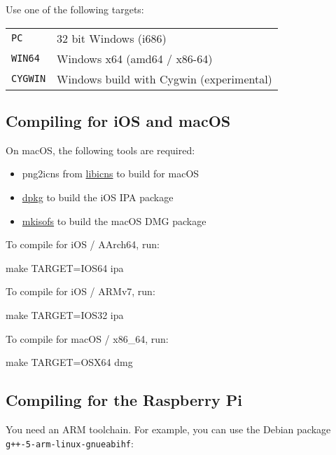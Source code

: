 Use one of the following targets:

\begin{tabularx}{1.9\textwidth}{lX}

\texttt{PC} & 32 bit Windows (i686) \\

\texttt{WIN64} & Windows x64 (amd64 / x86-64) \\

\texttt{CYGWIN} & Windows build with Cygwin (experimental) \\

\end{tabularx}

\subsection{Compiling for iOS and macOS}

On macOS, the following tools are required:
\begin{itemize}
\item png2icns from \href{http://icns.sourceforge.net}{libicns} to build for
  macOS
\item \href{https://alioth.debian.org/projects/dpkg}{dpkg} to build the iOS
  IPA package
\item \href{http://cdrecord.org/private/cdrecord.html}{mkisofs} to build the
  macOS DMG package
\end{itemize}

To compile for iOS / AArch64, run:

\begin{verbatim*}
make TARGET=IOS64 ipa
\end{verbatim*}

To compile for iOS / ARMv7, run:

\begin{verbatim*}
make TARGET=IOS32 ipa
\end{verbatim*}

To compile for macOS / x86\_64, run:

\begin{verbatim*}
make TARGET=OSX64 dmg
\end{verbatim*}

\subsection{Compiling for the Raspberry Pi}

You need an ARM toolchain.  For example, you can use the Debian
package \verb|g++-5-arm-linux-gnueabihf|:

